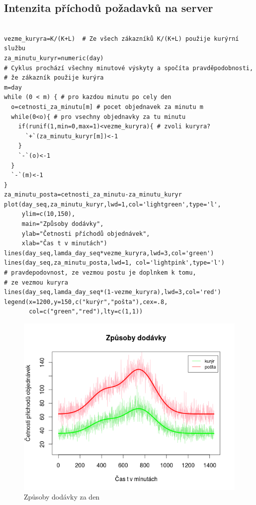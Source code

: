 \documentclass[12pt]{article}
\begin{document}
\subsection{Intenzita příchodů požadavků na server}
\begin{lstlisting}[frame=single]  % start your code-block

vezme_kuryra=K/(K+L)  # Ze všech zákazníků K/(K+L) použije kurýrní službu
za_minutu_kuryr=numeric(day) 
# Cyklus prochází všechny minutové výskyty a spočíta pravděpodobnosti,
# že zákazník použije kurýra
m=day
while (0 < m) { # pro kazdou minutu po cely den
  o=cetnosti_za_minutu[m] # pocet objednavek za minutu m
  while(0<o){ # pro vsechny objednavky za tu minutu
    if(runif(1,min=0,max=1)<vezme_kuryra){ # zvoli kuryra?
      `+`(za_minutu_kuryr[m])<-1
    }
    `-`(o)<-1
  }
  `-`(m)<-1
}
za_minutu_posta=cetnosti_za_minutu-za_minutu_kuryr
plot(day_seq,za_minutu_kuryr,lwd=1,col='lightgreen',type='l',
     ylim=c(10,150),
     main="Způsoby dodávky",
     ylab="Četnosti příchodů objednávek",
     xlab="Čas t v minutách")
lines(day_seq,lamda_day_seq*vezme_kuryra,lwd=3,col='green')
lines(day_seq,za_minutu_posta,lwd=1, col='lightpink',type='l')
# pravdepodovnost, ze vezmou postu je doplnkem k tomu,
# ze vezmou kuryra
lines(day_seq,lamda_day_seq*(1-vezme_kuryra),lwd=3,col='red')
legend(x=1200,y=150,c("kurýr","pošta"),cex=.8, 
       col=c("green","red"),lty=c(1,1))
\end{lstlisting}
\begin{figure}[ht!]
	\includegraphics[scale=0.6]{img/3_zpusoby_dodavky}\centering
	\caption{Způsoby dodávky za den}
	\label{obr:sikme}
\end{figure}
\end{document}
